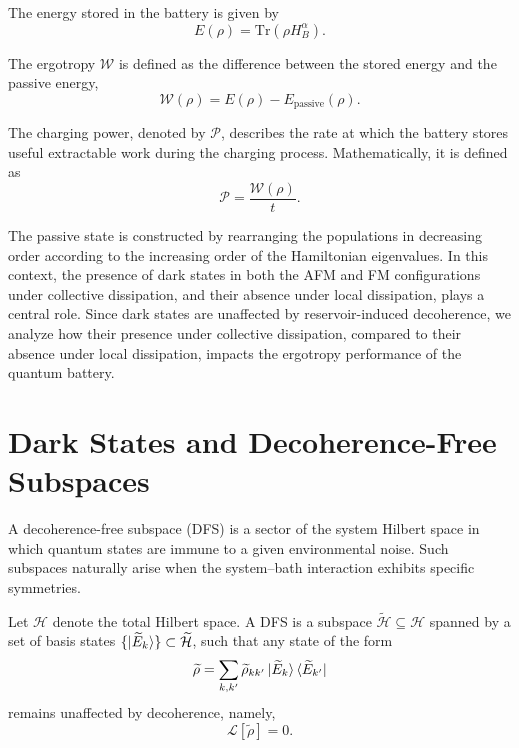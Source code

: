 \documentclass[aps,superscriptaddress,twocolumn,pre,longbibliography,floatfix]{revtex4-1}
\begin{document}
	The energy stored in the battery is given by
	\begin{equation}\label{Eq.Stored_Energy}
		E(\rho) = \mathrm{Tr}(\rho H_B^{\alpha}).
	\end{equation}
	
	The ergotropy $\mathcal{W}$ is defined as the difference between the stored energy and the passive energy,
	\begin{equation}\label{Eq.ERGOTROPY}
		\mathcal{W}(\rho) = E(\rho) - E_{\mathrm{passive}}(\rho).
	\end{equation}
	
	The charging power, denoted by $\mathcal{P}$, describes the rate at which the battery stores useful extractable work during the charging process. Mathematically, it is defined as
	\begin{equation}
		\mathcal{P} = \frac{\mathcal{W}(\rho)}{t}.
	\end{equation}
	
	The passive state is constructed by rearranging the populations in decreasing order according to the increasing order of the Hamiltonian eigenvalues. In this context, the presence of dark states in both the AFM and FM configurations under collective dissipation, and their absence under local dissipation, plays a central role. Since dark states are unaffected by reservoir-induced decoherence, we analyze how their presence under collective dissipation, compared to their absence under local dissipation, impacts the ergotropy performance of the quantum battery.
	
	\section{Dark States and Decoherence-Free Subspaces}
	\label{results}
	
	A decoherence-free subspace (DFS) is a sector of the system Hilbert space in which quantum states are immune to a given environmental noise. Such subspaces naturally arise when the system--bath interaction exhibits specific symmetries.
	
	Let $\mathcal{H}$ denote the total Hilbert space. A DFS is a subspace
	$\widetilde{\mathcal{H}} \subseteq \mathcal{H}$ spanned by a set of basis states
	$\{\ket{\widetilde{E}_k}\} \subset \widetilde{\mathcal{H}}$, such that any state of the form
	\begin{equation}
		\widetilde{\rho}
		=
		\sum_{k,k'}
		\widetilde{\rho}_{kk'}
		\ket{\widetilde{E}_k}
		\bra{\widetilde{E}_{k'}}
	\end{equation}
	remains unaffected by decoherence, namely,
	\begin{equation}
		\mathcal{L}[\widetilde{\rho}] = 0.
	\end{equation}
	
\end{document}
